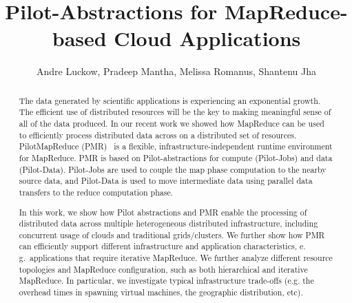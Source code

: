 \documentclass[times]{cpeauth}
\newcommand{\pilotmapreduce}{PilotMapReduce\xspace}
\begin{document}

\title{Pilot-Abstractions for MapReduce-based Cloud Applications}



\author{Andre Luckow, Pradeep Mantha, Melissa Romanus, Shantenu
  Jha\corrauth}

\address{Radical Research Group, Rutgers University}


\begin{abstract}

The data generated by scientific applications is experiencing an exponential
growth. The efficient use of distributed resources will be the key to making
meaningful sense of all of the data produced. In our recent work we showed how
MapReduce can be used to efficiently process distributed data across on a
distributed set of resources. \pilotmapreduce 
(PMR)~\cite{Mantha:2012:PEF:2287016.2287020} is a flexible,
infrastructure-independent runtime environment for MapReduce. PMR is based on
Pilot-abstractions for compute (Pilot-Jobs) and data (Pilot-Data). Pilot-Jobs
are used to couple the map phase computation to the nearby source data, and
Pilot-Data is used to move intermediate data using parallel data transfers to
the reduce computation phase.

In this work, we show how Pilot abstractions and PMR enable the processing of
distributed data across multiple heterogeneous distributed infrastructure,
including concurrent usage of clouds and traditional grids/clusters. We 
further show how PMR can efficiently support different infrastructure 
and application characteristics, e.\,g.\ applications that
require iterative MapReduce. We further analyze different resource topologies
and MapReduce configuration, such as both hierarchical and iterative 
MapReduce. In particular, we investigate typical infrastructure trade-offs 
(e.g. the overhead times in spawning virtual machines, the
geographic distribution, etc). 

\end{abstract}

\end{document}
